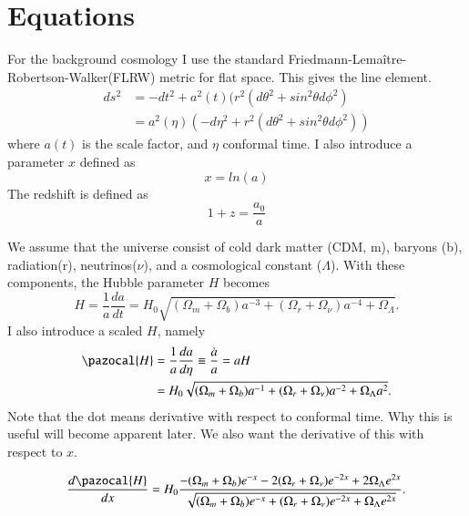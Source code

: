 \documentclass{aa}   %
\begin{document}
\section{Equations}\label{sec:Equations}
For the background cosmology I use the standard Friedmann-Lemaître-Robertson-Walker(FLRW) metric for flat space.
This gives the line element.
\begin{equation}\label{FLRW}
\begin{aligned}
ds^2 &= -dt^2 +a^2(t)(r^2(d\theta^2+sin^2\theta d\phi^2)\\
     &=a^2(\eta)(-d\eta^2 +r^2(d\theta^2+sin^2\theta d\phi^2))
\end{aligned}
\end{equation}
where $a(t)$ is the scale factor, and $\eta$ conformal time.
I also introduce a parameter $x$ defined as 
\begin{equation}\label{xeq}
 x = ln(a)
\end{equation}
The redshift is defined as
\begin{equation}
 1+ z =\frac{a_0}{a}
\end{equation}

We assume that the universe consist of cold dark matter (CDM, m), baryons (b), radiation(r), neutrinos($\nu$), and a cosmological constant ($\Lambda$). 
With these components, the Hubble parameter $H$ becomes
\begin{equation}
 H = \frac{1}{a}\frac{da}{dt} = H_0\sqrt{(\Omega_m+\Omega_b)a^{-3}+(\Omega_r+\Omega_\nu)a^{-4}+\Omega_\Lambda}.
\end{equation}
I also introduce a scaled $H$, namely
\begin{equation}
\begin{aligned}
\pazocal{H} &= \frac{1}{a}\frac{da}{d\eta} \equiv \frac{\dot{a}}{a} = aH\\
&=H_0\sqrt{(\Omega_m+\Omega_b)a^{-1}+(\Omega_r+\Omega_\nu)a^{-2}+\Omega_\Lambda a^2}.
\end{aligned}
\end{equation}
Note that the dot means derivative with respect to conformal time. Why this is useful will become apparent later.
We also want the derivative of this with respect to $x$.

\begin{equation}
 \frac{d\pazocal{H}}{dx} = H_0\frac{-(\Omega_m+\Omega_b)e^{-x}-2(\Omega_r+\Omega_\nu)e^{-2x}+2\Omega_\Lambda e^{2x}}{\sqrt{(\Omega_m+\Omega_b)e^{-x}+(\Omega_r+\Omega_\nu)e^{-2x}+\Omega_\Lambda e^{2x}}}.
\end{equation}
\end{document}
